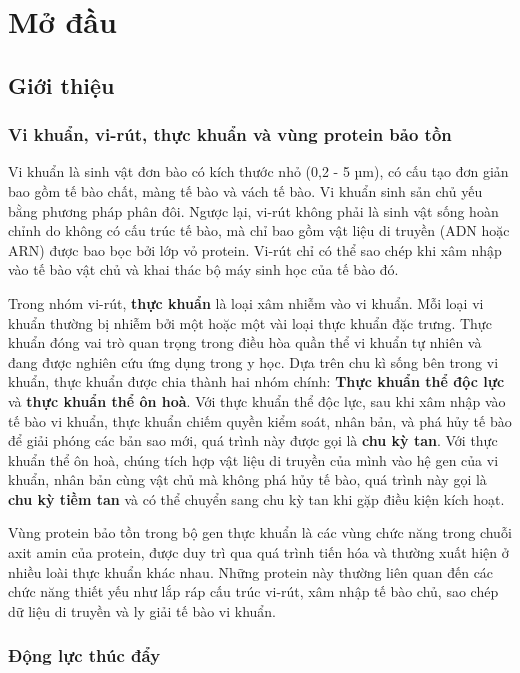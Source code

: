 \chapter{Mở đầu}
\setcounter{page}{1}
\section{Giới thiệu}

\subsection{Vi khuẩn, vi-rút, thực khuẩn và vùng protein bảo tồn}

Vi khuẩn là sinh vật đơn bào có kích thước nhỏ (0,2 - 5 µm), có cấu tạo đơn giản bao gồm tế bào chất, màng tế bào và vách tế bào. Vi khuẩn sinh sản chủ yếu bằng phương pháp phân đôi. Ngược lại, vi-rút không phải là sinh vật sống hoàn chỉnh do không có cấu trúc tế bào, mà chỉ bao gồm vật liệu di truyền (ADN hoặc ARN) được bao bọc bởi lớp vỏ protein. Vi-rút chỉ có thể sao chép khi xâm nhập vào tế bào vật chủ và khai thác bộ máy sinh học của tế bào đó.

Trong nhóm vi-rút, \textbf{thực khuẩn} là loại xâm nhiễm vào vi khuẩn. Mỗi loại vi khuẩn thường bị nhiễm bởi một hoặc một vài loại thực khuẩn đặc trưng. Thực khuẩn đóng vai trò quan trọng trong điều hòa quần thể vi khuẩn tự nhiên và đang được nghiên cứu ứng dụng trong y học. Dựa trên chu kì sống bên trong vi khuẩn, thực khuẩn được chia thành hai nhóm chính: \textbf{Thực khuẩn thể độc lực} và \textbf{thực khuẩn thể ôn hoà}. Với thực khuẩn thể độc lực, sau khi xâm nhập vào tế bào vi khuẩn, thực khuẩn chiếm quyền kiểm soát, nhân bản, và phá hủy tế bào để giải phóng các bản sao mới, quá trình này được gọi là \textbf{chu kỳ tan}. Với thực khuẩn thể ôn hoà, chúng tích hợp vật liệu di truyền của mình vào hệ gen của vi khuẩn, nhân bản cùng vật chủ mà không phá hủy tế bào, quá trình này gọi là \textbf{chu kỳ tiềm tan} và có thể chuyển sang chu kỳ tan khi gặp điều kiện kích hoạt.

Vùng protein bảo tồn trong bộ gen thực khuẩn là các vùng chức năng trong chuỗi axit amin của protein, được duy trì qua quá trình tiến hóa và thường xuất hiện ở nhiều loài thực khuẩn khác nhau. Những protein này thường liên quan đến các chức năng thiết yếu như lắp ráp cấu trúc vi-rút, xâm nhập tế bào chủ, sao chép dữ liệu di truyền và ly giải tế bào vi khuẩn.


\subsection{Động lực thúc đẩy}

